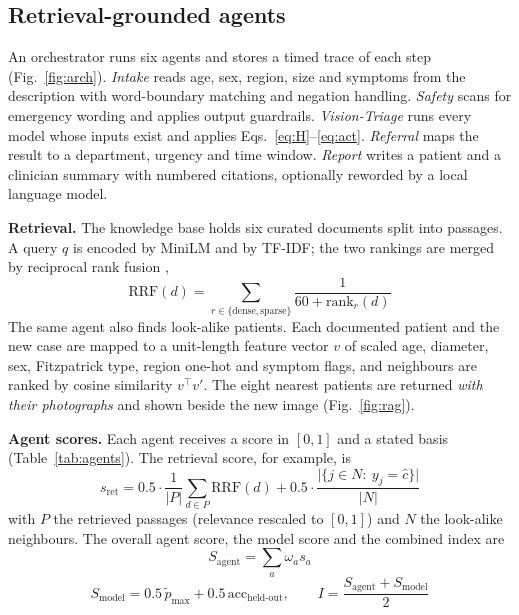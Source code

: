 \documentclass[conference]{IEEEtran}
\begin{document}
\subsection{Retrieval-grounded agents}
An orchestrator runs six agents and stores a timed trace of each step (Fig.~\ref{fig:arch}). \textit{Intake} reads age, sex, region, size and symptoms from the description with word-boundary matching and negation handling. \textit{Safety} scans for emergency wording and applies output guardrails. \textit{Vision-Triage} runs every model whose inputs exist and applies Eqs.~\eqref{eq:H}--\eqref{eq:act}. \textit{Referral} maps the result to a department, urgency and time window. \textit{Report} writes a patient and a clinician summary with numbered citations, optionally reworded by a local language model.

\textbf{Retrieval.} The knowledge base holds six curated documents split into passages. A query $q$ is encoded by MiniLM \cite{wang2020} and by TF-IDF; the two rankings are merged by reciprocal rank fusion \cite{cormack2009},
\begin{equation}
\mathrm{RRF}(d)=\sum_{r\in\{\mathrm{dense},\mathrm{sparse}\}}\frac{1}{60+\mathrm{rank}_r(d)}
\label{eq:rrf}
\end{equation}
The same agent also finds look-alike patients. Each documented patient and the new case are mapped to a unit-length feature vector $v$ of scaled age, diameter, sex, Fitzpatrick type, region one-hot and symptom flags, and neighbours are ranked by cosine similarity $v^{\top}v'$. The eight nearest patients are returned \emph{with their photographs} and shown beside the new image (Fig.~\ref{fig:rag}).

\textbf{Agent scores.} Each agent receives a score in $[0,1]$ and a stated basis (Table~\ref{tab:agents}). The retrieval score, for example, is
\begin{equation}
s_{\mathrm{ret}}=0.5\cdot\frac1{|P|}\sum_{d\in P}\mathrm{RRF}(d)+0.5\cdot\frac{\bigl|\{j\in N:\ y_j=\hat c\}\bigr|}{|N|}
\label{eq:sret}
\end{equation}
with $P$ the retrieved passages (relevance rescaled to $[0,1]$) and $N$ the look-alike neighbours. The overall agent score, the model score and the combined index are
\begin{equation}
S_{\mathrm{agent}}=\sum_{a}\omega_a s_a
\label{eq:sagent}
\end{equation}
\begin{equation}
S_{\mathrm{model}}=0.5\,\tilde p_{\max}+0.5\,\mathrm{acc}_{\mathrm{held\text{-}out}},\qquad
I=\frac{S_{\mathrm{agent}}+S_{\mathrm{model}}}{2}
\label{eq:smodel}
\end{equation}
\end{document}
